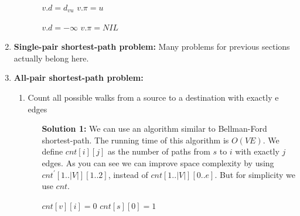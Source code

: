 \documentclass{book}
\begin{document}
\begin{enumerate}
\begin{enumerate}
\begin{itemize}
\begin{algorithm}[h!]
				\begin{algorithmic}[1]
							\State $v.d = d_{vu}$
							\State $v.\pi = u$
						\EndIf
					\EndFunction
				\end{algorithmic}
			\end{algorithm}
			\begin{algorithm}[h!]
				\begin{algorithmic}
							\State $v.d = -\infty$
							\State $v.\pi = NIL$
						\EndFor
					\EndFunction
				\end{algorithmic}
			\end{algorithm}
			\FloatBarrier			
		\end{itemize}
	\end{enumerate}
	\item \textbf{Single-pair shortest-path problem:}
	Many problems for previous sections actually belong here.
	\item \textbf{All-pair shortest-path problem:}
		\begin{enumerate}
			\phantomsection
			\label{psec:count_all_possible_paths_with_exactly_e_edges}
			\item Count all possible walks from a source to a destination with exactly e edges
			\begin{itemize}
				\item[\textbf{Solution 1:}] We can use an algorithm similar to Bellman-Ford shortest-path. The running time of this algorithm is $O(VE)$. We define $cnt[i][j]$ as the number of paths from $s$ to $i$ with exactly $j$ edges. As you can see we can improve space complexity by using $cnt^{\prime}[1..|V|][1..2]$, instead of $cnt[1..|V|][0..e]$. But for simplicity we use $cnt$.
                    \begin{algorithm}[h!]
                        \begin{algorithmic}[1]
                                	\ForAll{$i = 1$ to $e$}
                                		\State $cnt[v][i] = 0$
                                	\EndFor
                                \EndFor
                                \State $cnt[s][0] = 1$
                            \EndFunction
                        \end{algorithmic}
                        

\end{algorithm}
\end{itemize}
\end{enumerate}
\end{enumerate}
\end{document}
